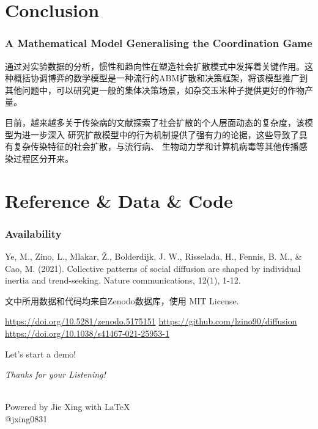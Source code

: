 \documentclass{beamer}
\begin{document}
\section{Conclusion}
\begin{frame}
	\sectionpage
\end{frame}
	\begin{frame}
		\frametitle{A Mathematical Model Generalising the Coordination Game}
		\setlength{\parindent}{2em} 
		\addtolength{\parskip}{6pt}
		通过对实验数据的分析，惯性和趋向性在塑造社会扩散模式中发挥着关键作用。这种概括协调博弈的数学模型是一种流行的ABM扩散和决策框架，将该模型推广到其他问题中，可以研究更一般的集体决策场景，如杂交玉米种子提供更好的作物产量。
		
		目前，越来越多关于传染病的文献探索了社会扩散的个人层面动态的复杂度，该模型为进一步深入	
	    研究扩散模型中的行为机制提供了强有力的论据，这些导致了具有复杂传染特征的社会扩散，与流行病、
	    生物动力学和计算机病毒等其他传播感染过程区分开来。
    \end{frame}
	
	
\section{Reference \& Data \& Code}
	\begin{frame}
		\frametitle{Availability}
		\begin{itemize}
			\item<1-> Ye, M., Zino, L., Mlakar, Ž., Bolderdijk, J. W., Risselada, H., Fennis, B. M., & Cao, M. (2021). Collective patterns of social diffusion are shaped by individual inertia and trend-seeking. Nature communications, 12(1), 1-12.
			\item<2-> 文中所用数据和代码均来自Zenodo数据库，使用 MIT License.
			\begin{center}
				\url{https://doi.org/10.5281/zenodo.5175151}
				\url{https://github.com/lzino90/diffusion}
				\url{https://doi.org/10.1038/s41467-021-25953-1}
			\end{center}
		    \begin{center}
            \item<3-> Let's start a demo!
		    \end{center}

		\end{itemize}
	\end{frame}
	
\begin{frame}{}
	\begin{block}{}
		\centerline{\huge{\emph{\itshape{Thanks for your Listening!}}}}
	\end{block}
	\begin{center}
~\\ \small{Powered by Jie Xing with \LaTeX \\
	@jxing0831}
    \end{center}


\end{frame}
	
	
\end{document}
